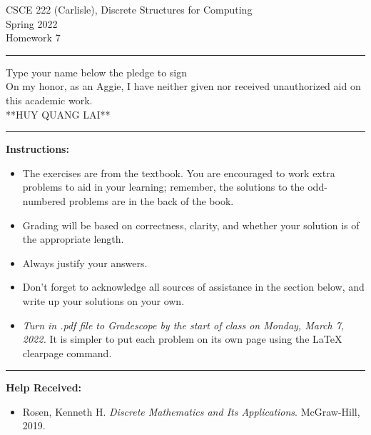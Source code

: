 \documentclass[12pt]{article}  %
\begin{document}
\begin{center}         %
{\large                %
CSCE 222 (Carlisle), Discrete Structures for Computing \\  %
Spring 2022 \\
Homework 7}
\end{center}
\rule{6in}{.1pt}       %
\begin{center}
{\large
Type your name below the pledge to sign\\
On my honor, as an Aggie, I have neither given nor received unauthorized aid on this academic work.\\
**HUY QUANG LAI**}
\end{center}


\rule{6in}{.1pt}       %
                    
\noindent              %
{\bf Instructions:}    %

\begin{itemize}        %
\item The exercises are from the textbook.  You are encouraged to work
      extra problems to aid in your learning; remember, the solutions to 
      the odd-numbered problems are in the back of the book.
\item Grading will be based on correctness, clarity, and whether your
      solution is of the appropriate length.
\item Always justify your answers.
\item Don't forget to acknowledge all sources of assistance in the section below, and write up your solutions on your own.
\item {\em Turn in .pdf file to Gradescope by the start of class on Monday, March 7, 2022.}  It is simpler to put each problem on its own page using the LaTeX clearpage command.
\end{itemize}


\rule{6in}{.1pt}       %

{\bf Help Received:}    %
\begin{itemize}
\item Rosen, Kenneth H. \emph{Discrete Mathematics and Its Applications}. McGraw-Hill, 2019.
\end{itemize}
\end{document}
